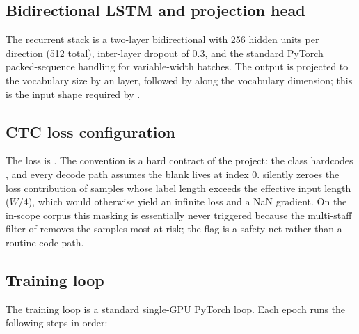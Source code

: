 \subsection{Bidirectional LSTM and projection head}

The recurrent stack is a two-layer bidirectional  with
\num{256} hidden units per direction (\num{512} total), inter-layer
dropout of \num{0.3}, and the standard PyTorch packed-sequence handling
for variable-width batches.
The output is projected to the vocabulary size by an 
layer, followed by  along the vocabulary dimension;
this is the input shape required by .

\subsection{CTC loss configuration}

The loss is .
The  convention is a hard contract of the project: the
 class hardcodes , and every decode
path assumes the blank lives at index $0$.
 silently zeroes the loss contribution of
samples whose label length exceeds the effective input length
($W/4$), which would otherwise yield an infinite loss and a NaN
gradient.
On the in-scope corpus this masking is essentially never triggered
because the multi-staff filter of  removes the
samples most at risk; the flag is a safety net rather than a routine
code path.

\subsection{Training loop}

The training loop is a standard single-GPU PyTorch loop.
Each epoch runs the following steps in order:

